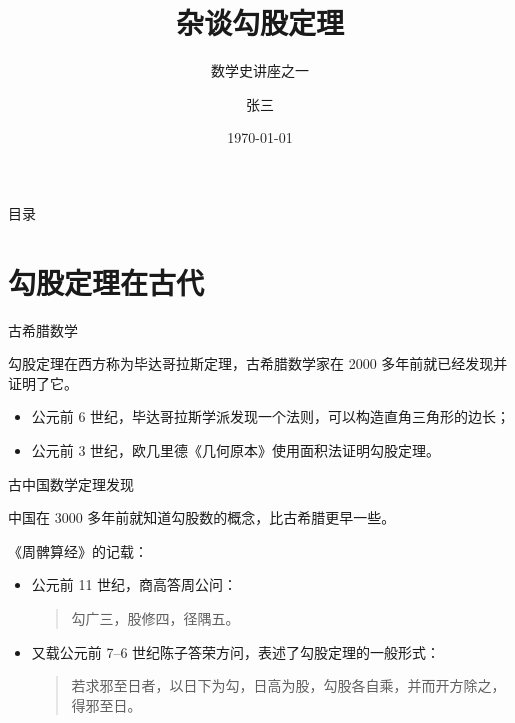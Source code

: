 \documentclass[no-math,xcolor=table]{beamer}
\title{杂谈勾股定理}
\subtitle{数学史讲座之一}
\institute{九章学堂}
\author{张三}
\date{\today}
\begin{document}
\begin{frame}
\titlepage
\end{frame}

\begin{frame}{目录}
\tableofcontents[pausesections]
\end{frame}

\section{勾股定理在古代}
\label{sec:ancient}

\begin{frame}{古希腊数学}

勾股定理在西方称为毕达哥拉斯定理，古希腊数学家在 2000 多年前就已经发现并证明了它\cite{Kline}。\pause
\begin{itemize}
\item<+-| alert@+>
  公元前 6 世纪，毕达哥拉斯学派发现一个法则，可以构造直角三角形的边长；
\item<+-| alert@+>
  公元前 3 世纪，欧几里德《几何原本》使用面积法证明勾股定理。
\end{itemize}
\end{frame}

\begin{frame}{古中国数学}{定理发现}

中国在 3000 多年前就知道勾股数的概念，比古希腊更早一些。\pause

《周髀算经》的记载：\pause
\begin{itemize}[<+-| alert@+>]
\item
  公元前 11 世纪，商高答周公问：
\begin{quote}
勾广三，股修四，径隅五。
\end{quote}
\item
  又载公元前 7--6 世纪陈子答荣方问，表述了勾股定理的一般形式：
\begin{quote}
若求邪至日者，以日下为勾，日高为股，勾股各自乘，并而开方除之，得邪至日。
\end{quote}
\end{itemize}
\end{frame}
\end{document}
